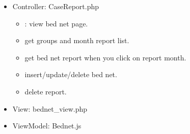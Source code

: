 \documentclass[letterpaper,10pt,english,openany,oneside]{sphinxmanual}
\begin{document}
\begin{itemize}
\item {} 
\sphinxAtStartPar
Controller: CaseReport.php
\begin{itemize}
\item {} 
\sphinxAtStartPar
{} : view bed net page.

\item {} 
\sphinxAtStartPar
{} get groups and month report list.

\item {} 
\sphinxAtStartPar
{} get bed net report when you click on report month.

\item {} 
\sphinxAtStartPar
{} insert/update/delete bed net.

\end{itemize}

\begin{sphinxVerbatim}[commandchars=\\\{\}]
     
   
      
   
 
\end{sphinxVerbatim}
\begin{itemize}
\item {} 
\sphinxAtStartPar
{} delete report.

\end{itemize}

\item {} 
\sphinxAtStartPar
View: bednet\_view.php

\item {} 
\sphinxAtStartPar
ViewModel: Bednet.js

\end{itemize}

\begin{sphinxVerbatim}[commandchars=\\\{\}]
  
  
    
    
  
  
     
     
\end{sphinxVerbatim}
\end{document}
